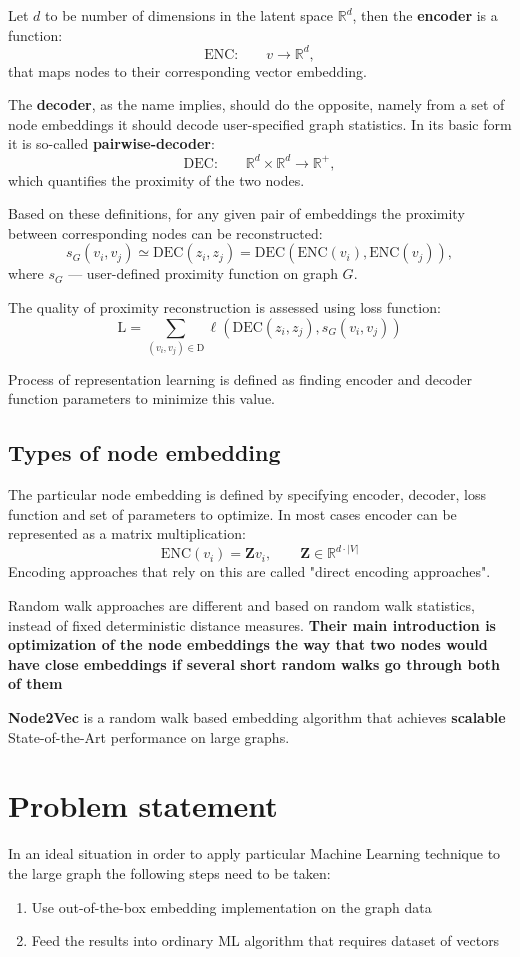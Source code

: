 Let $d$ to be number of dimensions in the latent space $\mathbb{R}^d$, then the \textbf{encoder} is a function:
$$
\text{ENC:}\qquad v \to \mathbb{R}^d,
$$
that maps nodes to their corresponding vector embedding. 

The \textbf{decoder}, as the name implies, should do the opposite, namely from a set of node embeddings it should decode user-specified graph statistics. In its basic form it is so-called \textbf{pairwise-decoder}:
$$
	\text{DEC:}\qquad \mathbb{R}^d \times \mathbb{R}^d \to \mathbb{R}^{+},
$$
which quantifies the proximity of the two nodes.

Based on these definitions, for any given pair of embeddings the proximity between corresponding nodes can be reconstructed: 
$$
   s_G(v_i, v_j) \simeq \mathrm{DEC}(z_i, z_j) 
     = \mathrm{DEC}(\mathrm{ENC}(v_i), \mathrm{ENC}(v_j)),
$$
where $s_G$ --- user-defined proximity function on graph $G$.

The quality of proximity reconstruction is assessed using loss function: 
$$
   \mathrm{L} = \sum_{(v_i, v_j) \in \mathrm{D}} \ell\left(
     \mathrm{DEC}(z_i, z_j), s_G(v_i, v_j)
   \right)
$$

Process of representation learning is defined as finding encoder and decoder function parameters to minimize this value.

\subsection{Types of node embedding}

The particular node embedding is defined by specifying encoder, decoder, loss function and set of parameters to optimize. In most cases encoder can be represented as a matrix multiplication: 
$$
  \mathrm{ENC}(v_i) = \mathbf{Z} v_i, \qquad \mathbf{Z} \in \mathbb{R}^{d \cdot |V|}
$$
Encoding approaches that rely on this are called "direct encoding approaches". %

Random walk approaches are different and based on random walk statistics, instead of fixed deterministic distance measures. \textbf{Their main introduction is optimization of the node embeddings the way that two nodes would have close embeddings if several short random walks go through both of them}

\textbf{Node2Vec} is a random walk based embedding algorithm that achieves \textbf{scalable} State-of-the-Art performance on large graphs.%

\section{Problem statement}
In an ideal situation in order to apply particular Machine Learning technique to the large graph the following steps need to be taken:
\begin{enumerate}
\item Use out-of-the-box embedding implementation on the graph data
\item Feed the results into ordinary ML algorithm that requires dataset of vectors
\end{enumerate}

